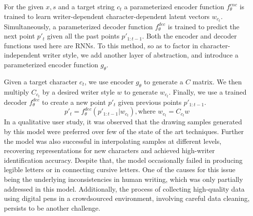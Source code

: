 \documentclass[10pt,twocolumn,letterpaper]{article}
\begin{document}
For the given $x, s$ and a target string $c_t$ a parameterized encoder function $f^{enc}_{\theta}$ is trained to learn writer-dependent character-dependent latent vectors $w_{c_t}$. Simultaneously, a parameterized decoder function $f^{dec}_{\theta}$ is trained to predict the next point $p'_t$ given all the past points $p'_{1:t-1}$. Both the encoder and decoder functions used here are RNNs. To this method, so as to factor in character-independent writer style, we add another layer of abstraction, and introduce a parameterized encoder function $g_{\theta}$. 

Given a target character $c_t$, we use encoder $g_{\theta}$ to generate a $C$ matrix. We then multiply $C_{c_t}$ by a desired writer style $w$ to generate $w_{c_t}$. Finally, we use a trained decoder $f^{dec}_{\theta}$ to create a new point $p'_t$ given previous points $p'_{1:t-1}$.
\begin{equation*}
  p'_t = f^{dec}_{\theta}(p'_{1:t-1}|w_{c_t}), \text{where } w_{c_t} = C_{c_t}w
\end{equation*}
In a qualitative user study, it was observed that the drawing samples generated by this model were preferred over few of the state of the art techniques. Further the model was also successful in interpolating samples at different levels, recovering representations for new characters and achieved high-writer identification accuracy. Despite that, the model occasionally failed in producing legible letters or in connecting cursive letters. One of the causes for this issue being the underlying inconsistencies in human writing, which was only partially addressed in this model. Additionally, the process of collecting high-quality data using digital pens in a crowdsourced environment, involving careful data cleaning, persists to be another challenge. 
\end{document}
